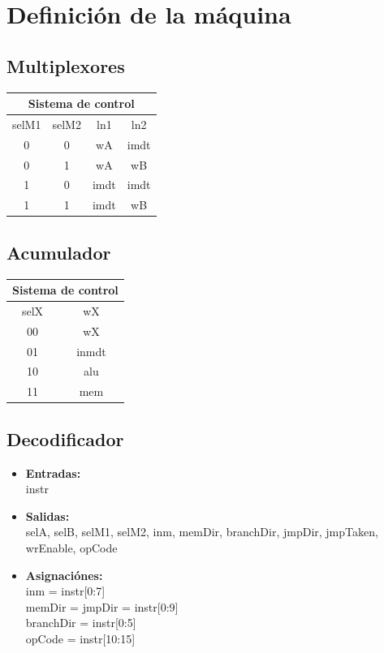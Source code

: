 \documentclass[paper=letter, fontsize=12pt]{article}
\begin{document}
\section{Definición de la máquina}

\subsection{Multiplexores}

\begin{table}[h]
\centering
\begin{tabular}{cc|cc}
\multicolumn{4}{c}{Sistema de control} \\ \hline
selM1 & selM2 & ln1 	& ln2  \\ \hline
0     & 0     & wA 	& imdt \\
0     & 1     & wA	& wB   \\
1     & 0     & imdt	& imdt \\
1     & 1     & imdt	& wB   \\
\end{tabular}
\end{table}

\subsection{Acumulador}

\begin{table}[h]
\centering
\begin{tabular}{c|c}
\multicolumn{2}{c}{Sistema de control} \\ \hline
selX   & wX    \\ \hline
00     & wX    \\
01     & inmdt \\
10     & alu   \\
11     & mem   \\
\end{tabular}
\end{table}

\subsection{Decodificador}

\begin{itemize}
\item \textbf{Entradas:}\\
instr
\item \textbf{Salidas:}\\
selA, selB, selM1, selM2, inm, memDir, branchDir, jmpDir, jmpTaken, wrEnable, opCode
\item \textbf{Asignaciónes:} \\
inm = instr[0:7] \\
memDir = jmpDir = instr[0:9] \\
branchDir = instr[0:5] \\
opCode = instr[10:15]
\end{itemize}
\end{document}
